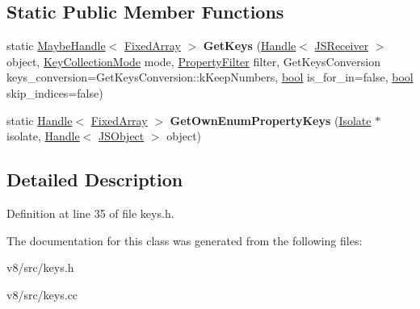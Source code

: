 \subsection*{Static Public Member Functions}
\begin{DoxyCompactItemize}
\item 
\mbox{\label{classv8_1_1internal_1_1KeyAccumulator_a5e59f6d2faa1b3d5b87883f402a9c215}} 
static \mbox{\hyperlink{classv8_1_1internal_1_1MaybeHandle}{Maybe\+Handle}}$<$ \mbox{\hyperlink{classv8_1_1internal_1_1FixedArray}{Fixed\+Array}} $>$ {\bfseries Get\+Keys} (\mbox{\hyperlink{classv8_1_1internal_1_1Handle}{Handle}}$<$ \mbox{\hyperlink{classv8_1_1internal_1_1JSReceiver}{J\+S\+Receiver}} $>$ object, \mbox{\hyperlink{namespacev8_a0cee20f5c7f0d59d0835af8e537388dc}{Key\+Collection\+Mode}} mode, \mbox{\hyperlink{namespacev8_afbf02b6b1152a3e25d7bde90798209ac}{Property\+Filter}} filter, Get\+Keys\+Conversion keys\+\_\+conversion=Get\+Keys\+Conversion\+::k\+Keep\+Numbers, \mbox{\hyperlink{classbool}{bool}} is\+\_\+for\+\_\+in=false, \mbox{\hyperlink{classbool}{bool}} skip\+\_\+indices=false)
\item 
\mbox{\label{classv8_1_1internal_1_1KeyAccumulator_a4233f594a143b834c81161b2ad8553f6}} 
static \mbox{\hyperlink{classv8_1_1internal_1_1Handle}{Handle}}$<$ \mbox{\hyperlink{classv8_1_1internal_1_1FixedArray}{Fixed\+Array}} $>$ {\bfseries Get\+Own\+Enum\+Property\+Keys} (\mbox{\hyperlink{classv8_1_1internal_1_1Isolate}{Isolate}} $\ast$isolate, \mbox{\hyperlink{classv8_1_1internal_1_1Handle}{Handle}}$<$ \mbox{\hyperlink{classv8_1_1internal_1_1JSObject}{J\+S\+Object}} $>$ object)
\end{DoxyCompactItemize}


\subsection{Detailed Description}


Definition at line 35 of file keys.\+h.



The documentation for this class was generated from the following files\+:\begin{DoxyCompactItemize}
\item 
v8/src/keys.\+h\item 
v8/src/keys.\+cc\end{DoxyCompactItemize}
